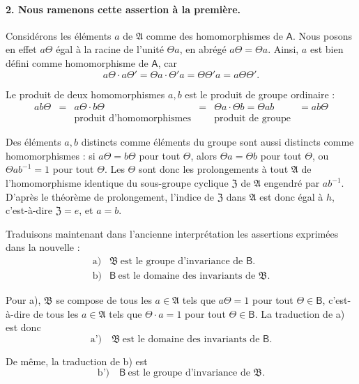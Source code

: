 \paragraph{2. Nous ramenons cette assertion à la première.}

Considérons les éléments \(a\) de \(\mathfrak A\) comme des homomorphismes de \(\mathsf A\). Nous posons en effet \(a\Theta\) égal à la racine de l'unité \(\Theta a\), en abrégé \(a\Theta=\Theta a\). Ainsi, \(a\) est bien défini comme homomorphisme de \(\mathsf A\), car
\[
a\Theta\cdot a\Theta'=\Theta a\cdot\Theta' a=\Theta\Theta' a=a\Theta\Theta'.
\]

Le produit de deux homomorphismes \(a,b\) est le produit de groupe ordinaire :
\[
\begin{array}{cccccc}
ab\Theta&=&a\Theta\cdot b\Theta&=&\Theta a\cdot\Theta b=\Theta ab&=ab\Theta\\
&&\text{produit d'homomorphismes}&&\text{produit de groupe}&
\end{array}
\]

Des éléments \(a,b\) distincts comme éléments du groupe sont aussi distincts comme homomorphismes : si \(a\Theta=b\Theta\) pour tout \(\Theta\), alors \(\Theta a=\Theta b\) pour tout \(\Theta\), ou \(\Theta ab^{-1}=1\) pour tout \(\Theta\). Les \(\Theta\) sont donc les prolongements à tout \(\mathfrak A\) de l'homomorphisme identique du sous-groupe cyclique \(\mathfrak Z\) de \(\mathfrak A\) engendré par \(ab^{-1}\). D'après le théorème de prolongement, l'indice de \(\mathfrak Z\) dans \(\mathfrak A\) est donc égal à \(h\), c'est-à-dire \(\mathfrak Z=e\), et \(a=b\).

Traduisons maintenant dans l'ancienne interprétation les assertions exprimées dans la nouvelle :
\[
\begin{array}{ll}
\text{a)}& \mathfrak B\ \text{est le groupe d'invariance de }\mathsf B.\\
\text{b)}& \mathsf B\ \text{est le domaine des invariants de }\mathfrak B.
\end{array}
\]

Pour a), \(\mathfrak B\) se compose de tous les \(a\in\mathfrak A\) tels que \(a\Theta=1\) pour tout \(\Theta\in\mathsf B\), c'est-à-dire de tous les \(a\in\mathfrak A\) tels que \(\Theta\cdot a=1\) pour tout \(\Theta\in\mathsf B\). La traduction de a) est donc
\[
\text{a')} \quad \mathfrak B\ \text{est le domaine des invariants de }\mathsf B.
\]

De même, la traduction de b) est
\[
\text{b')} \quad \mathsf B\ \text{est le groupe d'invariance de }\mathfrak B.
\]

